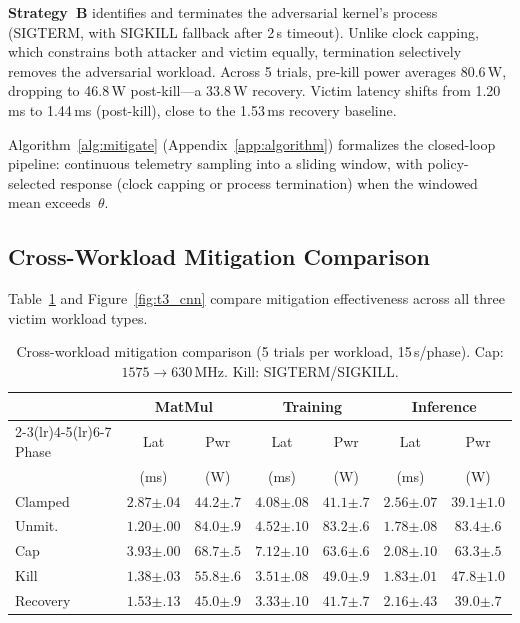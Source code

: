 \documentclass[letterpaper,twocolumn,10pt]{article}
\begin{document}
\textbf{Strategy~B} identifies and terminates the adversarial
kernel's process (SIGTERM, with SIGKILL fallback after 2\,s
timeout).  Unlike clock capping, which constrains both attacker
and victim equally, termination selectively removes the adversarial
workload.  Across 5 trials, pre-kill power averages 80.6\,W,
dropping to 46.8\,W post-kill---a 33.8\,W recovery.  Victim latency
shifts from 1.20\,ms to 1.44\,ms (post-kill), close to the 1.53\,ms
recovery baseline.

Algorithm~\ref{alg:mitigate} (Appendix~\ref{app:algorithm})
formalizes the closed-loop pipeline: continuous telemetry sampling
into a sliding window, with policy-selected response (clock capping
or process termination) when the windowed mean exceeds~$\theta$.

\subsection{Cross-Workload Mitigation Comparison}
\label{sec:mit-compare}

Table~\ref{tab:t3_cnn} and Figure~\ref{fig:t3_cnn} compare
mitigation effectiveness across all three victim workload types.

\begin{table}[t]
\centering
\caption{Cross-workload mitigation comparison (5 trials per workload,
  15\,s/phase). Cap: $1575 \to 630$\,MHz. Kill: SIGTERM/SIGKILL.}
\label{tab:t3_cnn}
\small
\setlength{\tabcolsep}{3pt}
\begin{tabular}{@{}l cc cc cc@{}}
\toprule
& \multicolumn{2}{c}{\textbf{MatMul}} & \multicolumn{2}{c}{\textbf{Training}} & \multicolumn{2}{c}{\textbf{Inference}} \\
\cmidrule(lr){2-3}\cmidrule(lr){4-5}\cmidrule(lr){6-7}
Phase & Lat & Pwr & Lat & Pwr & Lat & Pwr \\
& \footnotesize(ms) & \footnotesize(W) & \footnotesize(ms) & \footnotesize(W) & \footnotesize(ms) & \footnotesize(W) \\
\midrule
Clamped   & $2.87{\scriptstyle\pm.04}$ & $44.2{\scriptstyle\pm.7}$ & $4.08{\scriptstyle\pm.08}$ & $41.1{\scriptstyle\pm.7}$ & $2.56{\scriptstyle\pm.07}$ & $39.1{\scriptstyle\pm1.0}$ \\
Unmit.    & $1.20{\scriptstyle\pm.00}$ & $84.0{\scriptstyle\pm.9}$ & $4.52{\scriptstyle\pm.10}$ & $83.2{\scriptstyle\pm.6}$ & $1.78{\scriptstyle\pm.08}$ & $83.4{\scriptstyle\pm.6}$ \\
Cap       & $3.93{\scriptstyle\pm.00}$ & $68.7{\scriptstyle\pm.5}$ & $7.12{\scriptstyle\pm.10}$ & $63.6{\scriptstyle\pm.6}$ & $2.08{\scriptstyle\pm.10}$ & $63.3{\scriptstyle\pm.5}$ \\
Kill      & $1.38{\scriptstyle\pm.03}$ & $55.8{\scriptstyle\pm.6}$ & $3.51{\scriptstyle\pm.08}$ & $49.0{\scriptstyle\pm.9}$ & $1.83{\scriptstyle\pm.01}$ & $47.8{\scriptstyle\pm1.0}$ \\
Recovery  & $1.53{\scriptstyle\pm.13}$ & $45.0{\scriptstyle\pm.9}$ & $3.33{\scriptstyle\pm.10}$ & $41.7{\scriptstyle\pm.7}$ & $2.16{\scriptstyle\pm.43}$ & $39.0{\scriptstyle\pm.7}$ \\
\bottomrule
\end{tabular}
\end{table}
\end{document}
